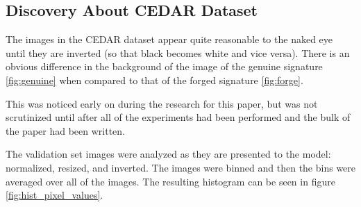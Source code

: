 






\subsection{Discovery About CEDAR Dataset}\label{sec:cedar_flaw}
The images in the CEDAR dataset appear quite reasonable to the naked eye until they are inverted (so that black becomes white and vice versa).
There is an obvious difference in the background of the image of the genuine signature \ref{fig:genuine} when compared to that of the forged signature \ref{fig:forge}.

This was noticed early on during the research for this paper, but was not scrutinized until after all of the experiments had been performed and the bulk of the paper had been written.

The validation set images were analyzed as they are presented to the model: normalized, resized, and inverted.
The images were binned and then the bins were averaged over all of the images.
The resulting histogram can be seen in figure \ref{fig:hist_pixel_values}.

